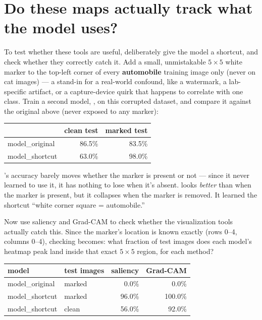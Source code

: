 \section{Do these maps actually track what the model uses?}

To test whether these tools are useful, deliberately give the model a shortcut, and check whether they correctly catch it. Add a small, unmistakable $5\times5$ white marker to the top-left corner of every \textbf{automobile} training image only (never on cat images) --- a stand-in for a real-world confound, like a watermark, a lab-specific artifact, or a capture-device quirk that happens to correlate with one class. Train a second model, , on this corrupted dataset, and compare it against the original  above (never exposed to any marker):

\begin{center}
\renewcommand{\arraystretch}{1.3}
\begin{tabular}{lrr}
\hline
 & \textbf{clean test} & \textbf{marked test} \\
\hline
model\_original & 86.5\% & 83.5\% \\
model\_shortcut & 63.0\% & 98.0\% \\
\hline
\end{tabular}
\end{center}

's accuracy barely moves whether the marker is present or not --- since it never learned to use it, it has nothing to lose when it's absent.  looks \emph{better} than  when the marker is present, but it collapses when the marker is removed. It learned the shortcut ``white corner square = automobile.''

Now use saliency and Grad-CAM to check whether the visualization tools actually catch this. Since the marker's location is known exactly (rows 0--4, columns 0--4), checking becomes: what fraction of test images does each model's heatmap peak land inside that exact $5\times5$ region, for each method?

\begin{center}
\renewcommand{\arraystretch}{1.3}
\begin{tabular}{llrr}
\hline
\textbf{model} & \textbf{test images} & \textbf{saliency} & \textbf{Grad-CAM} \\
\hline
model\_original & marked & 0.0\%   & 0.0\% \\
model\_shortcut & marked & 96.0\%  & 100.0\% \\
model\_shortcut & clean  & 56.0\%  & 92.0\% \\
\hline
\end{tabular}
\end{center}

